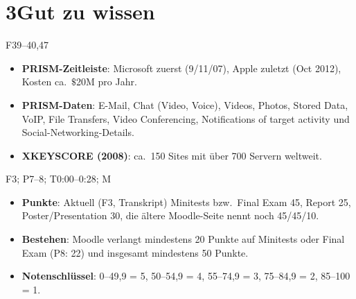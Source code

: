 \documentclass[10pt,a4paper]{article}
\newcommand{\block}[2]{\par\vspace{3pt}{\bfseries #1}\hfill{\scriptsize #2}\par\nopagebreak}
\begin{document}
\section*{3\quad Gut zu wissen}
\block{Details aus den Bildfolien}{F39--40,47}
\begin{itemize}
\item \textbf{PRISM-Zeitleiste}: Microsoft zuerst (9/11/07), Apple zuletzt (Oct 2012), Kosten ca.\ $\$$20M pro Jahr.
\item \textbf{PRISM-Daten}: E-Mail, Chat (Video, Voice), Videos, Photos, Stored Data, VoIP, File Transfers, Video Conferencing, Notifications of target activity und Social-Networking-Details.
\item \textbf{XKEYSCORE (2008)}: ca.\ 150 Sites mit über 700 Servern weltweit.
\end{itemize}
\block{Bewertung: Angaben widersprechen sich}{F3; P7--8; T0:00--0:28; M}
\begin{itemize}
\item \textbf{Punkte}: Aktuell (F3, Transkript) Minitests bzw.\ Final Exam 45, Report 25, Poster/Presentation 30, die ältere Moodle-Seite nennt noch 45/45/10.
\item \textbf{Bestehen}: Moodle verlangt mindestens 20 Punkte auf Minitests oder Final Exam (P8: 22) und insgesamt mindestens 50 Punkte.
\item \textbf{Notenschlüssel}: 0--49,9 = 5, 50--54,9 = 4, 55--74,9 = 3, 75--84,9 = 2, 85--100 = 1.
\end{itemize}
\end{document}
